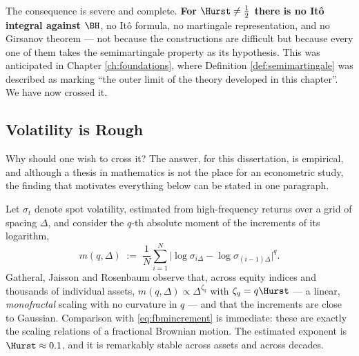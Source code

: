The consequence is severe and complete. \textbf{For $\Hurst \neq \tfrac12$ there is no Itô integral
against $\BH$}, no Itô formula, no martingale representation, and no Girsanov theorem --- not
because the constructions are difficult but because every one of them takes the semimartingale
property as its hypothesis. This was anticipated in Chapter \ref{ch:foundations}, where Definition
\ref{def:semimartingale} was described as marking ``the outer limit of the theory developed in this
chapter''. We have now crossed it.

\subsection{Volatility is Rough}\label{subsec:roughvol}

Why should one wish to cross it? The answer, for this dissertation, is empirical, and although a
thesis in mathematics is not the place for an econometric study, the finding that motivates
everything below can be stated in one paragraph.

Let $\sigma_t$ denote spot volatility, estimated from high-frequency returns over a grid of
spacing $\Delta$, and consider the $q$-th absolute moment of the increments of its logarithm,
\begin{equation}\label{eq:scalingmoment}
m(q,\Delta) \;:=\; \frac{1}{N}\sum_{i=1}^{N} \bigl|\log\sigma_{i\Delta} - \log\sigma_{(i-1)\Delta}\bigr|^{q} .
\end{equation}
Gatheral, Jaisson and Rosenbaum \cite{gatheraljaissonrosenbaum2018} observe that, across equity
indices and thousands of individual assets, $m(q,\Delta) \propto \Delta^{\zeta_q}$ with
$\zeta_q = q\Hurst$ --- a linear, \emph{monofractal} scaling with no curvature in $q$ --- and that
the increments are close to Gaussian. Comparison with \eqref{eq:fbmincrement} is immediate: these
are exactly the scaling relations of a fractional Brownian motion. The estimated exponent is
$\Hurst \approx 0.1$, and it is remarkably stable across assets and across decades.


